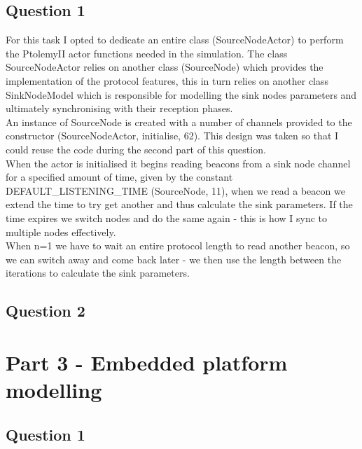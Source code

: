 \documentclass[12pt]{article} %
\begin{document}
\subsection{Question 1} %
For this task I opted to dedicate an entire class (SourceNodeActor) to perform the PtolemyII actor functions needed in the simulation. The class SourceNodeActor relies on another class (SourceNode) which provides the implementation of the protocol features, this in turn relies on another class SinkNodeModel which is responsible for modelling the sink nodes parameters and ultimately synchronising with their reception phases.
\\
An instance of SourceNode is created with a number of channels provided to the constructor (SourceNodeActor, initialise, 62). This design was taken so that I could reuse the code during the second part of this question.
\\
When the actor is initialised it begins reading beacons from a sink node channel for a specified amount of time, given by the constant DEFAULT_LISTENING_TIME (SourceNode, 11), when we read a beacon we extend the time to try get another and thus calculate the sink parameters. If the time expires we switch nodes and do the same again - this is how I sync to multiple nodes effectively.
\\
When n=1 we have to wait an entire protocol length to read another beacon, so we can switch away and come back later - we then use the length between the iterations to calculate the sink parameters.


\subsection{Question 2} %



\section{Part 3 - Embedded platform modelling}

\subsection{Question 1}
\end{document}
